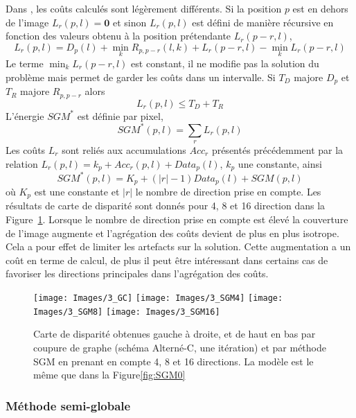 \documentclass[../main/These_Mathias_Paget.tex]{subfiles}
\begin{document}
Dans \citep{Hirschmuller08PAMI}, les coûts calculés sont légèrement différents. Si la position $p$ est en dehors de l'image $L_r(p,l) = \boldsymbol{0}$ et sinon $L_r(p,l)$ est défini de manière récursive en fonction des valeurs obtenu à la position prétendante $L_r(p{-}r,l)$,
\begin{equation}
	L_r(p,l) = D_{p}(l) + \min_{k}{R_{p,p{-}r}(l,k) + L_r(p{-}r,l)} - \min_{k}{L_r(p{-}r,l)}
\end{equation}
Le terme $\min_{k}{L_r(p{-}r,l)}$ est constant, il ne modifie pas la solution du problème mais permet de garder les coûts dans un intervalle. Si $T_D$ majore $D_{p}$ et $T_R$ majore $R_{p,p{-}r}$ alors
\begin{equation}
	L_r(p,l) \leq T_D + T_R
\end{equation}
L’énergie $SGM^{*}$ est définie par pixel,
\begin{equation}
	SGM^{*}(p,l) = \sum_{r}{L_r(p,l)}
\end{equation}
Les coûts $L_r$ sont reliés aux accumulations $Acc_r$ présentés précédemment  par la relation $L_r(p,l)= k_p + Acc_r(p,l) + Data_p(l)$, $k_p$ une constante, ainsi
\begin{equation}
	SGM^{*}(p,l) = K_p + (|r|{-}1)Data_p(l) + SGM(p,l)
\end{equation}
où $K_p$ est une constante et $|r|$ le nombre de direction prise en compte. Les résultats de carte de disparité sont donnés pour 4, 8 et 16 direction dans la Figure~\ref{fig:SGMs}. Lorsque le nombre de direction prise en compte est élevé la couverture de l'image augmente et l’agrégation des coûts devient de plus en plus isotrope. Cela a pour effet de limiter les artefacts sur la solution. Cette augmentation a un coût en terme de calcul, de plus il peut être intéressant dans certains cas de favoriser les directions principales dans l’agrégation des coûts.

\begin{figure}
\centering
\texttt{[image: Images/3\_GC]}
\texttt{[image: Images/3\_SGM4]}
\texttt{[image: Images/3\_SGM8]}
\texttt{[image: Images/3\_SGM16]}
\caption{Carte de disparité obtenues gauche à droite, et de haut en bas par coupure de graphe (schéma Alterné-C, une itération) et par méthode SGM en prenant en compte 4, 8 et 16 directions. La modèle est le même que dans la Figure\ref{fig:SGM0}}
\label{fig:SGMs}
\end{figure}

\subsubsection{Méthode semi-globale}
\end{document}
